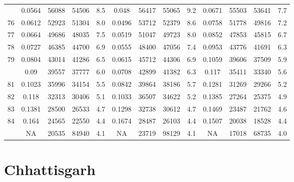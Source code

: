 \documentclass[
  14pt,
]{article}
\begin{document}
\begin{longtable}[t]{lcccccccccccc}
\addlinespace
75 & 0.0564 & 56088 & 54506 & 8.5 & 0.048 & 56417 & 55065 & 9.2 & 0.0671 & 55503 & 53641 & 7.7\\
76 & 0.0612 & 52923 & 51304 & 8.0 & 0.0496 & 53712 & 52379 & 8.6 & 0.0758 & 51778 & 49816 & 7.2\\
77 & 0.0664 & 49686 & 48035 & 7.5 & 0.0519 & 51047 & 49723 & 8.0 & 0.0852 & 47853 & 45815 & 6.7\\
78 & 0.0727 & 46385 & 44700 & 6.9 & 0.0555 & 48400 & 47056 & 7.4 & 0.0953 & 43776 & 41691 & 6.3\\
79 & 0.0804 & 43014 & 41286 & 6.5 & 0.0615 & 45712 & 44306 & 6.9 & 0.1059 & 39606 & 37509 & 5.9\\
\addlinespace
80 & 0.09 & 39557 & 37777 & 6.0 & 0.0708 & 42899 & 41382 & 6.3 & 0.117 & 35411 & 33340 & 5.6\\
81 & 0.1023 & 35996 & 34154 & 5.5 & 0.0842 & 39864 & 38186 & 5.7 & 0.1281 & 31269 & 29266 & 5.2\\
82 & 0.118 & 32313 & 30406 & 5.1 & 0.1033 & 36507 & 34622 & 5.2 & 0.1385 & 27264 & 25375 & 4.9\\
83 & 0.1381 & 28500 & 26533 & 4.7 & 0.1298 & 32738 & 30612 & 4.7 & 0.1469 & 23487 & 21762 & 4.6\\
84 & 0.164 & 24565 & 22550 & 4.4 & 0.1674 & 28487 & 26103 & 4.4 & 0.1507 & 20038 & 18528 & 4.4\\
\addlinespace
85 & NA & 20535 & 84940 & 4.1 & NA & 23719 & 98129 & 4.1 & NA & 17018 & 68735 & 4.0\\*
\end{longtable}

\pagebreak

\hypertarget{chhattisgarh}{%
\section{Chhattisgarh}\label{chhattisgarh}}
\end{document}
